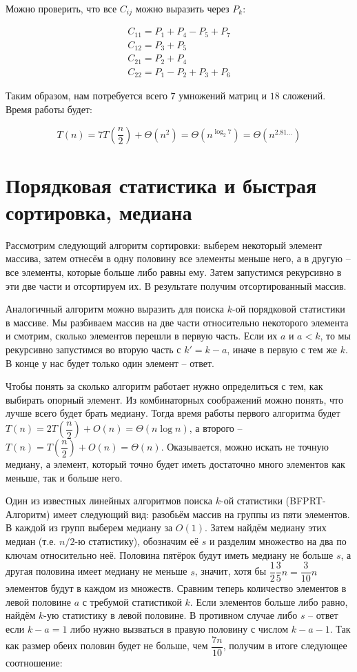 \documentclass{article}
\begin{document}
Можно проверить, что все $C_{ij}$ можно выразить через $P_k$:

$$\begin{matrix}
C_{11} = P_1 + P_4 - P_5 + P_7 \\
C_{12} = P_3 + P_5 \\
C_{21} = P_2 + P_4 \\
C_{22} = P_1 - P_2 + P_3 + P_6
\end{matrix}$$

Таким образом, нам потребуется всего $7$ умножений матриц и $18$ сложений. Время работы будет:

$$T(n) = 7T\left(\dfrac n 2\right)+\Theta(n^2)=\Theta(n^{\log_2 7})=\Theta(n^{2.81\dots})$$

\section*{Порядковая статистика и быстрая сортировка, медиана} 

Рассмотрим следующий алгоритм сортировки: выберем некоторый элемент массива, затем отнесём в одну половину все элементы меньше него, а в другую -- все элементы, которые больше либо равны ему. Затем запустимся рекурсивно в эти две части и отсортируем их. В результате получим отсортированный массив. 

Аналогичный алгоритм можно выразить для поиска $k$-ой порядковой статистики в массиве. Мы разбиваем массив на две части относительно некоторого элемента и смотрим, сколько элементов перешли в первую часть. Если их $a$ и $a<k$, то мы рекурсивно запустимся во вторую часть с $k'=k-a$, иначе в первую с тем же $k$. В конце у нас будет только один элемент -- ответ.

Чтобы понять за сколько алгоритм работает нужно определиться с тем, как выбирать опорный элемент. Из комбинаторных соображений можно понять, что лучше всего будет брать медиану. Тогда время работы первого алгоритма будет $T(n)= 2T\left(\dfrac n 2\right)+O(n)=\Theta(n \log n)$, а второго -- $T(n) = T\left(\dfrac n 2\right)+O(n)=\Theta(n)$. Оказывается, можно искать не точную медиану, а элемент, который точно будет иметь достаточно много элементов как меньше, так и больше него.

Один из известных линейных алгоритмов поиска $k$-ой статистики (BFPRT-Алгоритм) имеет следующий вид: разобьём массив на группы из пяти элементов. В каждой из групп выберем медиану за $O(1)$. Затем найдём медиану этих медиан (т.е. $n/2$-ю статистику), обозначим её $s$ и разделим множество на два по ключам относительно неё. Половина пятёрок будут иметь медиану не больше $s$, а другая половина имеет медиану не меньше $s$, значит, хотя бы $\dfrac{1}{2}\dfrac{3}{5}n=\dfrac{3}{10}n$ элементов будут в каждом из множеств. Сравним теперь количество элементов в левой половине $a$ с требумой статистикой $k$. Если элементов больше либо равно, найдём $k$-ую статистику в левой половине. В противном случае либо $s$ -- ответ если $k-a=1$ либо нужно вызваться в правую половину с числом $k-a-1$. Так как размер обеих половин будет не больше, чем $\dfrac{7n}{10}$, получим в итоге следующее соотношение:
\end{document}
